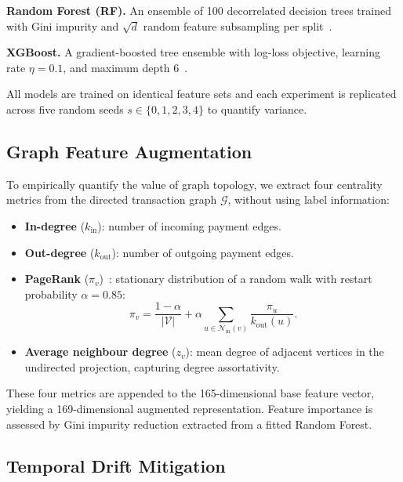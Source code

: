 \documentclass[conference]{IEEEtran}
\begin{document}
\smallskip\noindent\textbf{Random Forest (RF).}
An ensemble of 100 decorrelated decision trees trained with Gini impurity
and $\sqrt{d}$ random feature subsampling per split~\cite{breiman2001random}.

\smallskip\noindent\textbf{XGBoost.}
A gradient-boosted tree ensemble with log-loss objective, learning rate
$\eta = 0.1$, and maximum depth 6~\cite{chen2016xgboost}.

All models are trained on identical feature sets and each experiment is
replicated across five random seeds $s \in \{0,1,2,3,4\}$ to quantify
variance.

\subsection{Graph Feature Augmentation}

To empirically quantify the value of graph topology, we extract four
centrality metrics from the directed transaction graph $\mathcal{G}$,
without using label information:

\begin{itemize}
  \item \textbf{In-degree} ($k_{\text{in}}$): number of incoming payment
    edges.
  \item \textbf{Out-degree} ($k_{\text{out}}$): number of outgoing payment
    edges.
  \item \textbf{PageRank} ($\pi_v$)~\cite{page1999pagerank}:
    stationary distribution of a random walk with restart probability
    $\alpha = 0.85$:
    \begin{equation}
      \pi_v = \frac{1-\alpha}{|\mathcal{V}|}
              + \alpha \!\!\sum_{u\in\mathcal{N}_{\text{in}}(v)}
                \frac{\pi_u}{k_{\text{out}}(u)}.
      \label{eq:pr}
    \end{equation}
  \item \textbf{Average neighbour degree} ($z_v$): mean degree of adjacent
    vertices in the undirected projection, capturing degree assortativity.
\end{itemize}

These four metrics are appended to the 165-dimensional base feature vector,
yielding a 169-dimensional augmented representation.
Feature importance is assessed by Gini impurity reduction extracted from
a fitted Random Forest.

\subsection{Temporal Drift Mitigation}
\label{sec:method:drift}
\end{document}
